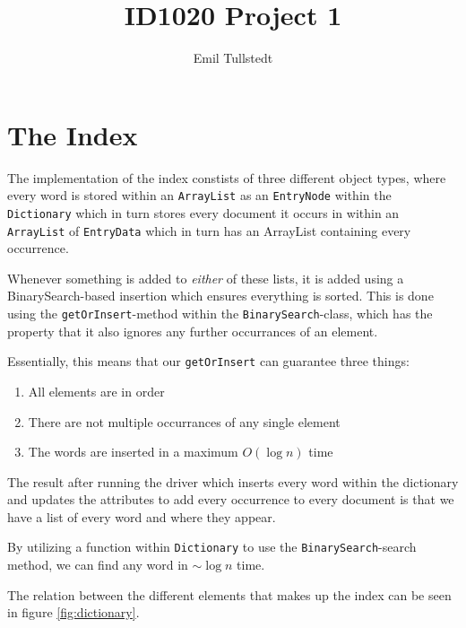 \documentclass[a4paper,11pt,notitlepage]{article}
\title{ID1020 Project 1}
\author{Emil Tullstedt}
\begin{document}
\maketitle

\tableofcontents

\newpage

\section{The Index}
\label{sec:theindex}

The implementation of the index constists of three different object types, where every word is stored within an \texttt{ArrayList} as an \texttt{EntryNode} within the \texttt{Dictionary} which in turn stores every document it occurs in within an \texttt{ArrayList} of \texttt{EntryData} which in turn has an ArrayList containing every occurrence.

Whenever something is added to \textit{either} of these lists, it is added using a BinarySearch-based insertion which ensures everything is sorted. This is done using the \texttt{getOrInsert}-method within the \texttt{BinarySearch}-class, which has the property that it also ignores any further occurrances of an element.

Essentially, this means that our \texttt{getOrInsert} can guarantee three things:

\begin{enumerate}
\item All elements are in order
\item There are not multiple occurrances of any single element
\item The words are inserted in a maximum $O(\log n)$ time
\end{enumerate}

The result after running the driver which inserts every word within the dictionary and updates the attributes to add every occurrence to every document is that we have a list of every word and where they appear.

By utilizing a function within \texttt{Dictionary} to use the \texttt{BinarySearch}-search method, we can find any word in $\sim\log n$ time.

The relation between the different elements that makes up the index can be seen in figure \ref{fig:dictionary}.
\end{document}
